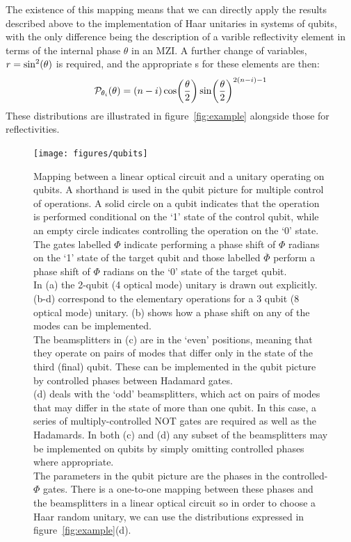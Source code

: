 The existence of this mapping means that we can directly apply the results
described above to the implementation of Haar unitaries in systems of qubits,
with the only difference being the description of a varible reflectivity element
in terms of the internal phase \(\theta\) in an MZI. A further change of
variables, \(r = \sin^{2} \!\left(\theta\right) \) is required, and the appropriate
\pdf{}s for these elements are then:
\begin{equation}
  \mathcal{P}_{\theta_{i}} \!\left( \theta \right) = \left( n-i \right) \cos \!\left(
  \frac{\theta}{2} \right) \sin \!\left( \frac{\theta}{2} \right)^{2 \left(n-i\right) -1}
\end{equation}
These distributions are illustrated in figure~\ref{fig:example} alongside those
for reflectivities.

\begin{figure}[p]
  \texttt{[image: figures/qubits]}
  \caption[Mapping between a linear optical circuit and a unitary operating on
    qubits]
    {Mapping between a linear optical circuit and a unitary operating on
    qubits. A shorthand is used in the qubit picture for multiple control of
    operations. A solid circle on a qubit indicates that the operation is
    performed conditional on the `1' state of the control qubit, while an empty
    circle indicates controlling the operation on the `0' state. The gates
    labelled \(\Phi\) indicate performing a phase shift of \(\Phi\) radians on
    the `1' state of the target qubit and those labelled \(\overline{\Phi}\)
    perform a phase shift of \(\Phi\) radians on the `0' state of the target
    qubit. \\
    In (a) the 2-qubit (4 optical mode) unitary is drawn out explicitly.
    (b-d) correspond to the elementary operations for a 3 qubit (8 optical mode)
    unitary. (b) shows how a phase shift on any of the modes can be
    implemented. \\
    The beamsplitters in (c) are in the `even' positions, meaning that they
    operate on pairs of modes that differ only in the state of the third (final)
    qubit. These can be implemented in the qubit picture by controlled phases
    between Hadamard gates. \\
    (d) deals with the `odd' beamsplitters, which act on
    pairs of modes that may differ in the state of more than one qubit. In this
    case, a series of multiply-controlled NOT gates are required as well as the
    Hadamards. In both (c) and (d) any subset of the beamsplitters may be
    implemented on qubits by simply omitting controlled phases where
    appropriate. \\
    The parameters in the qubit picture are the phases in the
    controlled-\(\Phi\)
    gates. There is a one-to-one mapping between these phases and the
    beamsplitters in a linear optical circuit so in order to
    choose a Haar random unitary, we can use the distributions expressed in
    figure~\ref{fig:example}(d).}
  \label{fig:qubits}
\end{figure}
  
